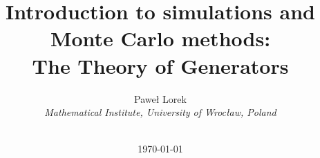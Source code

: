 \documentclass[aspectratio=169]{beamer}
\begin{document}
 

\title{Introduction to simulations and Monte Carlo methods:
\\ The Theory of Generators}
\author{Pawe{\l} Lorek  \\ \textsl{Mathematical Institute, University of Wroc{\l}aw, Poland} \\
\ \\
}


\date{\today}

\frame{\titlepage} 


% 



%
\end{document}
